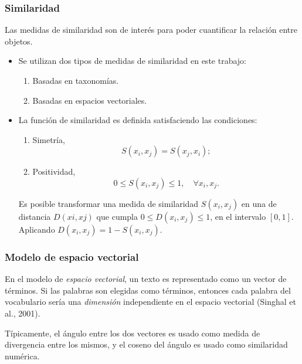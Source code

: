 \begin{frame}
	\frametitle{Similaridad}
	Las medidas de similaridad son de interés para poder cuantificar la relación entre objetos.
	\bigskip
	\begin{itemize}
		\item Se utilizan dos tipos de medidas de similaridad en este trabajo:
		\begin{enumerate}[<*>]
			\item Basadas en taxonomías.
			\item Basadas en espacios vectoriales.
		\end{enumerate}

		\bigskip
		\item
		La función de similaridad es definida satisfaciendo las condiciones:
		\begin{enumerate}[<*>]
			\item Simetría,
			\[S(x_i,x_j)=S(x_j,x_i);\]

			\item Positividad,
			\[0 \leq S(x_i,x_j) \leq 1, \quad \forall x_i,x_j.\]
		\end{enumerate}
		\medskip
		Es posible transformar una medida de similaridad \(S(x_i,x_j)\) en una de distancia \(D(xi,xj)\) que cumpla \(0 \leq D(x_i,x_j) \leq 1\), en el intervalo \([0,1]\). Aplicando \(D(x_i,x_j) = 1 - S(x_i,x_j)\).
	\end{itemize}
\end{frame}

\begin{frame}
	\frametitle{Modelo de espacio vectorial}
	En el modelo de \textit{espacio vectorial}, un texto es representado como un vector de términos. Si las palabras son elegidas como términos, entonces cada palabra del vocabulario sería una \textit{dimensión} independiente en el espacio vectorial (Singhal et al., 2001).

	\bigskip

	Típicamente, el ángulo entre los dos vectores es usado como medida de divergencia entre los mismos, y el coseno del ángulo es usado como similaridad numérica.
\end{frame}

